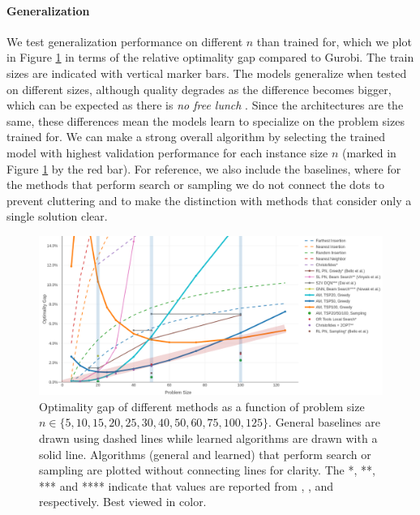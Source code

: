 

\paragraph{Generalization}
We test generalization performance on different $n$ than trained for, which we plot in Figure \ref{fig:generalization} in terms of the relative optimality gap compared to Gurobi. The train sizes are indicated with vertical marker bars. The models generalize when tested on different sizes, although quality degrades as the difference becomes bigger, which can be expected as there is \emph{no free lunch} \citep{wolpert1997no}. Since the architectures are the same, these differences mean the models learn to specialize on the problem sizes trained for. We can make a strong overall algorithm by selecting the trained model with highest validation performance for each instance size $n$ (marked in Figure \ref{fig:generalization} by the red bar). For reference, we also include the baselines, where for the methods that perform search or sampling we do not connect the dots to prevent cluttering and to make the distinction with methods that consider only a single solution clear.

\begin{figure}[t]
\begin{center}
\centerline{\includegraphics[trim={0 0 0 0},clip,width=\textwidth]{./images/generalization}}
\caption{Optimality gap of different methods as a function of problem size $n \in \{5, 10, 15, 20, 25, 30, 40, 50, 60, 75, 100, 125\}$. General baselines are drawn using dashed lines while learned algorithms are drawn with a solid line. Algorithms (general and learned) that perform search or sampling are plotted without connecting lines for clarity. The *, **, *** and **** indicate that values are reported from \citet{bello2016neural}, \citet{vinyals2015pointer}, \citet{dai2017learning} and \citet{nowak2017note} respectively. Best viewed in color.}
\label{fig:generalization}
\end{center}
\vskip -0.2in
\end{figure}


